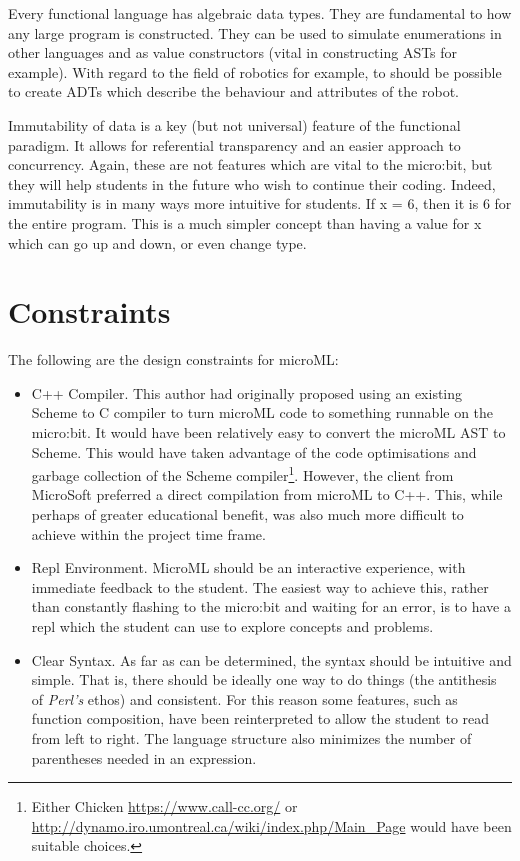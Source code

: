 \documentclass[12pt, a4paper]{report}
\begin{document}
Every functional language has algebraic data types. They are fundamental to how any large program is
constructed. They can be used to simulate enumerations in other languages and as value constructors
(vital in constructing ASTs for example). With regard to the field of robotics for example, to
should be possible to create ADTs which describe the behaviour and attributes of the robot.

Immutability of data is a key (but not universal) feature of the functional paradigm. It allows for
referential transparency and an easier approach to concurrency. Again, these are not features which
are vital to the micro:bit, but they will help students in the future who wish to continue their
coding. Indeed, immutability is in many ways more intuitive for students. If x = 6, then it is 6 for
the entire program. This is a much simpler concept than having a value for x which can go up and down,
or even change type.

\section{Constraints}
The following are the design constraints for microML:

\begin{itemize}
    \item C++ Compiler. This author had originally proposed using an existing Scheme to C compiler
        to turn microML code to something runnable on the micro:bit. It would have been relatively
        easy to convert the microML AST to Scheme. This would have taken advantage of the code
        optimisations and garbage collection of the Scheme compiler\footnote{Either Chicken
        \url{https://www.call-cc.org/} or \url{http://dynamo.iro.umontreal.ca/wiki/index.php/Main_Page} would have been suitable
        choices.}. However, the client from MicroSoft preferred a direct compilation from microML to
        C++. This, while perhaps of greater educational benefit, was also much more difficult to
        achieve within the project time frame. 
    \item Repl Environment. MicroML should be an interactive experience, with immediate feedback to
        the student. The easiest way to achieve this, rather than constantly flashing to the
        micro:bit and waiting for an error, is to have a repl which the student can use to explore
        concepts and problems. 
    \item Clear Syntax. As far as can be determined, the syntax should be intuitive and simple. That
        is, there should be ideally one way to do things (the antithesis of \textit{Perl's} ethos)
        and consistent. For this reason some features, such as function composition, have been
        reinterpreted to allow the student to read from left to right. The language structure also
        minimizes the number of parentheses needed in an expression.
\end{itemize}
\end{document}
